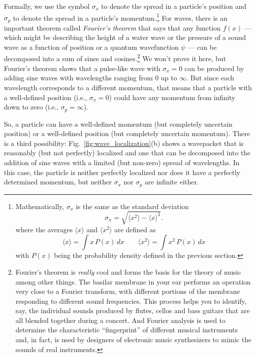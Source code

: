 Formally, we use the symbol $\sigma_x$ to denote the spread in a
particle's position and $\sigma_p$ to denote the spread in a particle's
momentum.\footnote{Mathematically, $\sigma_x$ is the same as the standard
deviation
\begin{equation}
 \sigma_x = \sqrt{\langle x^2 \rangle - \langle x\rangle^2 }.
\end{equation}
where the averages $\langle x\rangle$ and $\langle x^2\rangle$ are
defined as
\begin{equation}
\langle x\rangle = \int x\, P(x)\, dx \qquad
\langle x^2\rangle = \int x^2\, P(x)\, dx
\end{equation}
with $P(x)$ being the probability density defined in the previous section.}
For waves, there is an important theorem called {\it Fourier's
theorem} that says that any function $f(x)$ --- which
might be describing the height of a water wave or the pressure of a
sound wave as a function of position or a quantum wavefunction $\psi$
--- can be decomposed into a sum of sines and cosines.\footnote{Fourier's
theorem is {\it really} cool and forms the basis for the theory of music
among other things. The basilar membrane in your ear performs an operation
very close to a Fourier transform, with different portions of the membrane
responding to different sound frequencies. This process helps
you to identify, say, the individual sounds produced by flutes,
cellos and bass guitars that are all blended together during a concert. 
And Fourier analysis is used to determine the characteristic ``fingerprint''
of different musical instruments and, in fact, is used by designers
of electronic music synthesizers to mimic  the sounds of real instruments.}
We won't prove it here, but Fourier's theorem shows that a pulse-like
wave with $\sigma_x = 0$ can be produced by adding sine waves with
wavelengths ranging from 0 up to $\infty$. But since each wavelength
corresponds to a different momentum, that means that a particle with
a well-defined position (i.e., $\sigma_x = 0$) could have any momentum
from infinity down to zero (i.e., $\sigma_p = \infty$).

So, a particle can have a well-defined momentum (but completely uncertain
position) or a well-defined position (but completely uncertain momentum).
There is a third possibility: Fig.~\ref{fig:wave_localization}(b) shows
a wavepacket that is reasonably (but not perfectly) localized and one
that can be decomposed into the addition of sine waves with a limited
(but non-zero) spread of wavelengths. In this case, the particle
is neither perfectly localized nor does it have a perfectly determined
momentum, but neither $\sigma_x$ nor $\sigma_p$ are infinite either.

